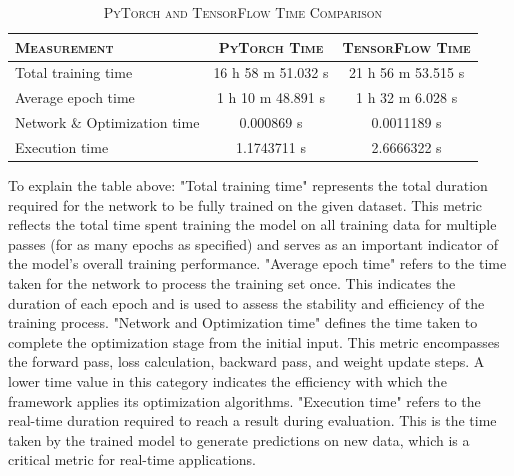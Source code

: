 \documentclass[conference]{IEEEtran}
\begin{document}
\begin{table}[h!]
\centering
\caption{\textsc{PyTorch and TensorFlow Time Comparison}}
\renewcommand{\arraystretch}{1} %
\setlength{\tabcolsep}{3pt} %
\begin{tabular}{|l|c|c|}
\hline
\textbf{\textsc{Measurement}}          & \textbf{\textsc{PyTorch Time}} & \textbf{\textsc{TensorFlow Time}} \\ \hline
Total training time                     & 16 h 58 m 51.032 s            & 21 h 56 m 53.515 s                \\ \hline
Average epoch time                      & 1 h 10 m 48.891 s             & 1 h 32 m 6.028 s                  \\ \hline
Network \& Optimization time            & 0.000869 s                    & 0.0011189 s                       \\ \hline
Execution time                          & 1.1743711 s                   & 2.6666322 s                       \\ \hline
\end{tabular}
\end{table}


To explain the table above:  
"Total training time" represents the total duration required for the network to be fully trained on the given dataset. This metric reflects the total time spent training the model on all training data for multiple passes (for as many epochs as specified) and serves as an important indicator of the model's overall training performance. "Average epoch time" refers to the time taken for the network to process the training set once. This indicates the duration of each epoch and is used to assess the stability and efficiency of the training process. "Network and Optimization time" defines the time taken to complete the optimization stage from the initial input. This metric encompasses the forward pass, loss calculation, backward pass, and weight update steps. A lower time value in this category indicates the efficiency with which the framework applies its optimization algorithms. "Execution time" refers to the real-time duration required to reach a result during evaluation. This is the time taken by the trained model to generate predictions on new data, which is a critical metric for real-time applications.
\end{document}
